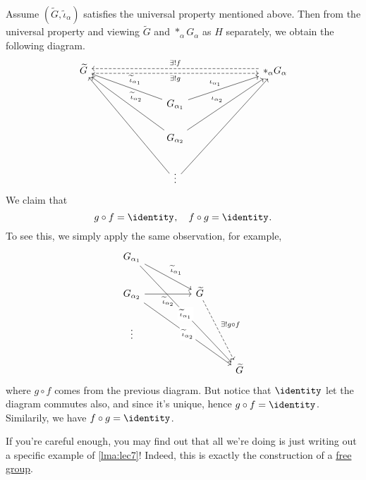 \begin{explanation}
	Assume \((\widetilde{G} , \widetilde{\iota} _\alpha  )\) satisfies the universal property mentioned above. Then from the universal property and viewing \(\widetilde{G} \) and
	\(\ast_\alpha G_\alpha \) as \(H\) separately, we obtain the following diagram.
	\[
		\begin{tikzcd}
			{\widetilde{G}} &&&&&& {\ast_\alpha G_\alpha} \\
			&&& {G_{\alpha_1}} \\
			&&& {G_{\alpha_2}} \\
			&&& \vdots
			\arrow["{\iota_{\alpha_1}}", from=2-4, to=1-7]
			\arrow["{\iota_{\alpha_2}}", from=3-4, to=1-7]
			\arrow["{\exists ! f}"', shift right=1, dashed, from=1-7, to=1-1]
			\arrow["{\widetilde{\iota}_{\alpha_1}}"', from=2-4, to=1-1]
			\arrow["{\widetilde{\iota}_{\alpha_2}}"', from=3-4, to=1-1]
			\arrow[from=4-4, to=1-1]
			\arrow[from=4-4, to=1-7]
			\arrow["{\exists! g}"', shift right=1, dashed, from=1-1, to=1-7]
		\end{tikzcd}
	\]
	We claim that
	\[
		g\circ f = \identity_{},\quad f\circ g = \identity_{}.
	\]
	To see this, we simply apply the same observation, for example,
	\[
		\begin{tikzcd}
			{G_{\alpha_1}} \\
			{G_{\alpha_2}} && {\widetilde{G}} \\
			\vdots \\
			&&& {\widetilde{G}}
			\arrow["{\widetilde{\iota}_{\alpha_1}}", from=1-1, to=2-3]
			\arrow["{\widetilde{\iota}_{\alpha_2}}"', from=2-1, to=2-3]
			\arrow["{\exists ! g\circ f}", dashed, from=2-3, to=4-4]
			\arrow["{\widetilde{\iota}_{\alpha_1}}"{description}, from=1-1, to=4-4]
			\arrow["{\widetilde{\iota}_{\alpha_2}}"{description}, from=2-1, to=4-4]
		\end{tikzcd}
	\]
	where \(g\circ f\) comes from the previous diagram. But notice that \(\identity_{} \) let the diagram commutes also, and since it's unique, hence \(g\circ f = \identity_{} \). Similarily,
	we have \(f\circ g = \identity_{} \).
\end{explanation}

If you're careful enough, you may find out that all we're doing is just writing out a specific example of \autoref{lma:lec7}! Indeed, this is exactly the construction of a
\hyperref[def:free-group]{free group}.

